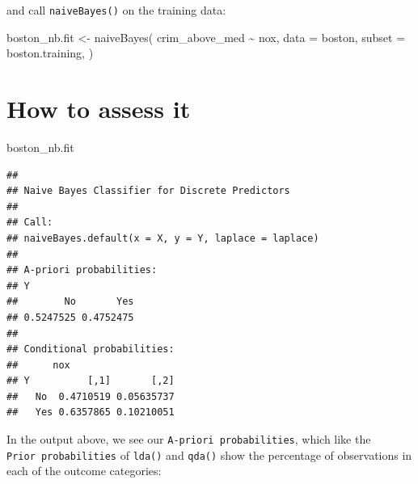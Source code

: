 \documentclass[
]{book}
\newenvironment{Shaded}{\begin{snugshade}}{\end{snugshade}}
\newcommand{\AttributeTok}[1]{\textcolor[rgb]{0.77,0.63,0.00}{#1}}
\newcommand{\DecValTok}[1]{\textcolor[rgb]{0.00,0.00,0.81}{#1}}
\newcommand{\FloatTok}[1]{\textcolor[rgb]{0.00,0.00,0.81}{#1}}
\newcommand{\FunctionTok}[1]{\textcolor[rgb]{0.00,0.00,0.00}{#1}}
\newcommand{\NormalTok}[1]{#1}
\newcommand{\OtherTok}[1]{\textcolor[rgb]{0.56,0.35,0.01}{#1}}
\newcommand{\SpecialCharTok}[1]{\textcolor[rgb]{0.00,0.00,0.00}{#1}}
\newcommand{\StringTok}[1]{\textcolor[rgb]{0.31,0.60,0.02}{#1}}
\begin{document}
and call \texttt{naiveBayes()} on the training data:

\begin{Shaded}
\begin{Highlighting}[]
\NormalTok{boston\_nb.fit }\OtherTok{\textless{}{-}}
  \FunctionTok{naiveBayes}\NormalTok{(}
\NormalTok{    crim\_above\_med }\SpecialCharTok{\textasciitilde{}}\NormalTok{ nox,}
    \AttributeTok{data =}\NormalTok{ boston,}
    \AttributeTok{subset =}\NormalTok{ boston.training,}
\NormalTok{  )}
\end{Highlighting}
\end{Shaded}

\hypertarget{how-to-assess-it-5}{%
\section{How to assess it}\label{how-to-assess-it-5}}

\begin{Shaded}
\begin{Highlighting}[]
\NormalTok{boston\_nb.fit}
\end{Highlighting}
\end{Shaded}

\begin{verbatim}
## 
## Naive Bayes Classifier for Discrete Predictors
## 
## Call:
## naiveBayes.default(x = X, y = Y, laplace = laplace)
## 
## A-priori probabilities:
## Y
##        No       Yes 
## 0.5247525 0.4752475 
## 
## Conditional probabilities:
##      nox
## Y          [,1]       [,2]
##   No  0.4710519 0.05635737
##   Yes 0.6357865 0.10210051
\end{verbatim}

In the output above, we see our \texttt{A-priori\ probabilities}, which like the \texttt{Prior\ probabilities} of \texttt{lda()} and \texttt{qda()} show the percentage of observations in each of the outcome categories:

\begin{Shaded}
\end{Shaded}
\end{document}
